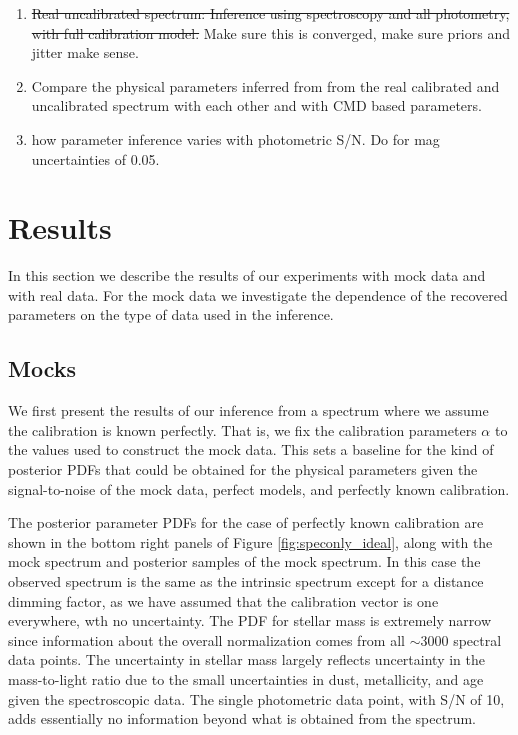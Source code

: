 \documentclass[iop,numberedappendix]{emulateapj}
\begin{document}
\begin{enumerate}
\item \sout{Real uncalibrated spectrum:   Inference using spectroscopy and all
  photometry, with full calibration model. } Make sure this is
converged, make sure priors and jitter make sense.

\item Compare the physical parameters inferred from from the real
  calibrated and uncalibrated spectrum with each other and with CMD
  based parameters.

\item how parameter inference varies with photometric S/N.  Do for mag
  uncertainties of 0.05.

\end{enumerate}

\section{Results}

In this section we describe the results of our experiments with mock
data and with real data.  For the mock data we investigate the
dependence of the recovered parameters on the type of data used in the
inference.

\subsection{Mocks}
We first present the results of our inference from a spectrum where we
assume the calibration is known perfectly.  That is, we fix the
calibration parameters $\alpha$ to the values used to construct the
mock data.  This sets a baseline for the kind of posterior PDFs that
could be obtained for the physical parameters given the
signal-to-noise of the mock data, perfect models, and perfectly known
calibration.

The posterior parameter PDFs for the case of perfectly known
calibration are shown in the bottom right panels of Figure
\ref{fig:speconly_ideal}, along with the mock spectrum and posterior
samples of the mock spectrum.  In this case the observed spectrum is
the same as the intrinsic spectrum except for a distance dimming
factor, as we have assumed that the calibration vector is one
everywhere, wth no uncertainty. The PDF for stellar mass is extremely
narrow since information about the overall normalization comes from all
$\sim 3000$ spectral data points.  The uncertainty in stellar mass
largely reflects uncertainty in the mass-to-light ratio due to the
small uncertainties in dust, metallicity, and age given the
spectroscopic data. The single photometric data point,
with S/N of 10, adds essentially no information beyond what is
obtained from the spectrum.
\end{document}

